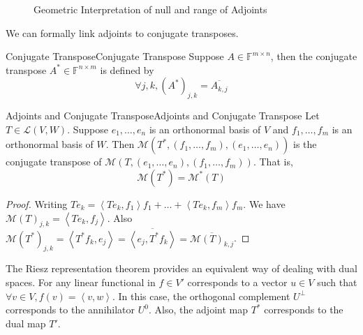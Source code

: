 \documentclass[../main.tex]{subfiles}
\begin{document}
\begin{figure}[H]
    \centering
    \caption{Geometric Interpretation of null and range of Adjoints}
    \label{fig:geometric-interpretation-of-null-and-range-of-adjoints}
\end{figure}

We can formally link adjoints to conjugate transposes.
\begin{definition}{Conjugate Transpose}{Conjugate Transpose}
Suppose $A\in \mathbb{F}^{m \times n}$, then the conjugate transpose $A^*\in \mathbb{F}^{n \times m}$ is defined by
\begin{equation*}
\forall j,k, (A^*)_{j,k} = \overline{A_{k,j}}
\end{equation*}
\end{definition}

\begin{theorem}{Adjoints and Conjugate Transpose}{Adjoints and Conjugate Transpose}
Let $T\in \mathscr{L}(V,W)$. Suppose $e_1, \ldots ,e_n$ is an orthonormal basis of $V$ and $f_1, \ldots ,f_m$ is an orthonormal basis of $W$. Then $\mathscr{M}(T^*, (f_1, \ldots ,f_m),(e_1, \ldots ,e_n))$ is the conjugate transpose of $\mathscr{M}(T,(e_1, \ldots ,e_n),(f_1, \ldots ,f_m))$. That is,
\begin{equation}
\mathscr{M}(T^*) = \mathscr{M}^*(T)
\end{equation}
\end{theorem}
\begin{proof}
Writing $T e_k = \left<Te_k,f_1\right> f_1 + \ldots + \left<Te_k, f_m\right> f_m$. We have $\mathscr{M}(T)_{j,k} = \left<Te_k,f_j\right> $. Also  $\mathscr{M}(T^*)_{j,k} = \left<T^*f_k,e_j\right> = \overline{\left<e_j,T^*f_k\right> } = \overline{\mathscr{M}(T)_{k,j}}$.
\end{proof}

\begin{remark}
The Riesz representation theorem provides an equivalent way of dealing with dual spaces. For any linear functional in $f\in V'$ corresponds to a vector $u\in V$ such that $\forall v\in V, f(v) = \left<v,w\right> $. In this case, the orthogonal complement $U^{\perp}$ corresponds to the annihilator $U^0$. Also, the adjoint map $T^*$ corresponds to the dual map $T'$.
\end{remark}
\end{document}

